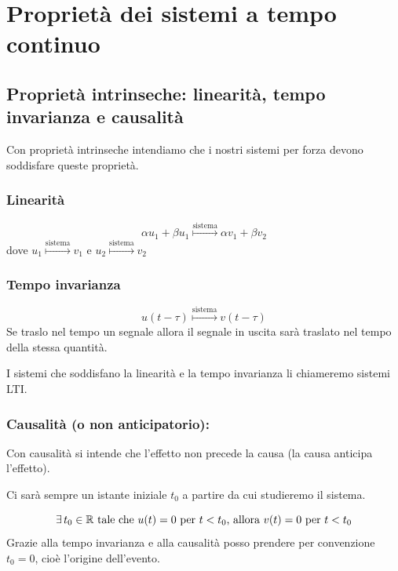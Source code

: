 
\section{Proprietà dei sistemi a tempo continuo}
	
	\subsection{Proprietà intrinseche: linearità, tempo invarianza e causalità}
	Con proprietà intrinseche intendiamo che i nostri sistemi per forza devono soddisfare queste proprietà.
		
		\subsubsection{Linearità}\label{sist_prop_Lin} 
			\[
			\alpha u_1+\beta u_1 \overset{\text{sistema}}{\longmapsto} \alpha v_1+\beta v_2
			\]
			dove $ u_1 \overset{\text{sistema}}{\longmapsto} v_1$ e $u_2\overset{\text{sistema}}{\longmapsto} v_2$
			
		\subsubsection{Tempo invarianza} \label{sist_prop_TIn}
			\[
			u(t-\tau) \overset{\text{sistema}}{\longmapsto} v(t-\tau)
			\]
			Se traslo nel tempo un segnale allora il segnale in uscita sarà traslato nel tempo della stessa quantità.
			
			\begin{definizione}
				I sistemi che soddisfano la linearità e la tempo invarianza li chiameremo sistemi LTI.
			\end{definizione}
		
		\subsubsection{Causalità (o non anticipatorio):} \label{sist_prop_cau}
			
			Con causalità si intende che l'effetto non precede la causa (la causa anticipa l'effetto).
			
			\begin{osservazione}
				Ci sarà sempre un istante iniziale $t_0$ a partire da cui studieremo il sistema.
			\end{osservazione}
			\[
				\exists \,t_0 \in \mathbb{R} \text{ tale che } u(t)=0 \text{ per } t<t_0
				\text{, allora } v(t)=0 \text{ per } t<t_0
			\]		
			Grazie alla tempo invarianza e alla causalità posso prendere per convenzione $ t_0 = 0$, cioè l'origine dell'evento.
			
